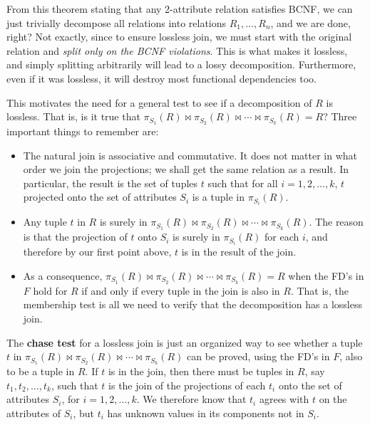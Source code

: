   From this theorem stating that any 2-attribute relation satisfies BCNF, we can just trivially decompose all relations into relations $R_1, \ldots, R_n$, and we are done, right? Not exactly, since to ensure lossless join, we must start with the original relation and \textit{split only on the BCNF violations}. This is what makes it lossless, and simply splitting arbitrarily will lead to a lossy decomposition. Furthermore, even if it was lossless, it will destroy most functional dependencies too. 

  This motivates the need for a general test to see if a decomposition of $R$ is lossless. That is, is it true that $\pi_{S_1}(R) \bowtie \pi_{S_2}(R) \bowtie \cdots \bowtie \pi_{S_k}(R) = R$? Three important things to remember are:

  \begin{itemize}
    \item The natural join is associative and commutative. It does not matter in what order we join the projections; we shall get the same relation as a result. In particular, the result is the set of tuples $t$ such that for all $i = 1, 2, \ldots, k$, $t$ projected onto the set of attributes $S_i$ is a tuple in $\pi_{S_i}(R)$.
    
    \item Any tuple $t$ in $R$ is surely in $\pi_{S_1}(R) \bowtie \pi_{S_2}(R) \bowtie \cdots \bowtie \pi_{S_k}(R)$. The reason is that the projection of $t$ onto $S_i$ is surely in $\pi_{S_i}(R)$ for each $i$, and therefore by our first point above, $t$ is in the result of the join.
    
    \item As a consequence, $\pi_{S_1}(R) \bowtie \pi_{S_2}(R) \bowtie \cdots \bowtie \pi_{S_k}(R) = R$ when the FD's in $F$ hold for $R$ if and only if every tuple in the join is also in $R$. That is, the membership test is all we need to verify that the decomposition has a lossless join.
  \end{itemize}

  \begin{theorem}
    \label{thm:chase-test-for-lossless-join}
    The \textbf{chase test} for a lossless join is just an organized way to see whether a tuple $t$ in $\pi_{S_1}(R) \bowtie \pi_{S_2}(R) \bowtie \cdots \bowtie \pi_{S_k}(R)$ can be proved, using the FD's in $F$, also to be a tuple in $R$. If $t$ is in the join, then there must be tuples in $R$, say $t_1, t_2, \ldots, t_k$, such that $t$ is the join of the projections of each $t_i$ onto the set of attributes $S_i$, for $i = 1,2,\ldots,k$. We therefore know that $t_i$ agrees with $t$ on the attributes of $S_i$, but $t_i$ has unknown values in its components not in $S_i$.
  \end{theorem}

